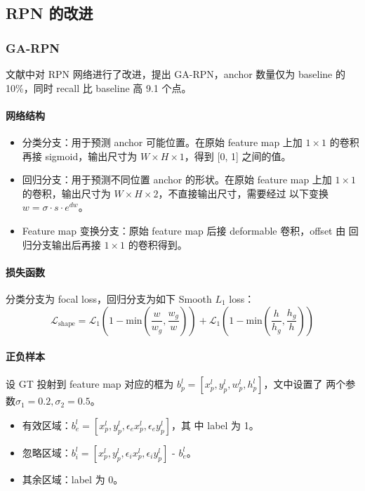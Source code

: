 \subsection{RPN 的改进}
\subsubsection{GA-RPN}
文献中对 RPN 网络进行了改进，提出 GA-RPN，anchor 数量仅为 baseline
的 10\%，同时 recall 比 baseline 高 9.1 个点。

\paragraph{网络结构}

\begin{itemize}
  \item 分类分支：用于预测 anchor 可能位置。在原始 feature map 上加 $1 \times 1$
    的卷积再接 sigmoid，输出尺寸为 $W \times H \times 1$，得到 [0, 1] 之间的值。
  \item 回归分支：用于预测不同位置 anchor 的形状。在原始 feature map 上加 $1
    \times 1$的卷积，输出尺寸为 $W \times H \times 2$，不直接输出尺寸，需要经过
    以下变换 $w = \sigma \cdot s \cdot e^{dw}$。
  \item Feature map 变换分支：原始 feature map 后接 deformable 卷积，offset 由
    回归分支输出后再接 $1 \times 1$ 的卷积得到。
\end{itemize}

\paragraph{损失函数}
分类分支为 focal loss，回归分支为如下 Smooth $L_1$ loss：
\begin{equation}
  \mathcal{L}_{\mathrm{shape}} = \mathcal{L}_1 \left( 1 - \mathrm{min}\left( \frac{w}{w_g}, \frac{w_g}{w} \right) \right) + \mathcal{L}_1 \left( 1 - \mathrm{min} \left( \frac{h}{h_g}, \frac{h_g}{h} \right) \right)
\end{equation}

\paragraph{正负样本}
设 GT 投射到 feature map 对应的框为 $b_p^l =[x_p^l, y_p^l, w_p^l, h_p^l]$，文中设置了
两个参数$\sigma_1 = 0.2, \sigma_2 = 0.5$。

\begin{itemize}
  \item 有效区域：$b_e^l=[x_p^l, y_p^l, \epsilon_e x_p^l, \epsilon_e y_p^l]$，其
    中 label 为 1。
  \item 忽略区域：$b_i^l=[x_p^l, y_p^l, \epsilon_i x_p^l, \epsilon_i y_p^l]$ -
    $b_e^l$。
  \item 其余区域：label 为 0。
\end{itemize}


